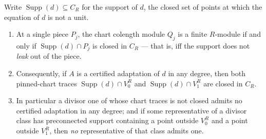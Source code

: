 \begin{theorem}
  \label{pa-thm:isCertified_chart_obstruction}
  \leanok

  Write \(\operatorname{Supp}(d) \subseteq C_R\) for the support of \(d\), the closed set
  of points at which the equation of \(d\) is not a unit.
  \begin{enumerate}
    \item At a single piece \(P_j\), the chart colength module \(Q_j\) is a finite
      \(R\)-module if and only if \(\operatorname{Supp}(d) \cap P_j\) is closed in \(C_R\)
      --- that is, iff the support does not \emph{leak} out of the piece.
    \item Consequently, if \(A\) is a certified adaptation of \(d\) in any degree, then both
      pinned-chart traces \(\operatorname{Supp}(d) \cap V_0^R\) and
      \(\operatorname{Supp}(d) \cap V_1^R\) are closed in \(C_R\).
    \item In particular a divisor one of whose chart traces is not closed admits no
      certified adaptation in any degree; and if some representative of a divisor class has
      preconnected support containing a point outside \(V_0^R\) and a point outside
      \(V_1^R\), then \emph{no} representative of that class admits one.
  \end{enumerate}
\end{theorem}

